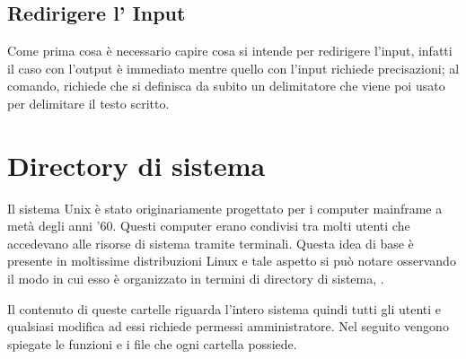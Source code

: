 \subsection{Redirigere l' Input}
\label{subsec:Redirigere-l-Input}
Come prima cosa è necessario capire cosa si intende per redirigere l'input, infatti il caso con l'output è immediato mentre quello con l'input richiede precisazioni;  al comando, richiede che si definisca da subito un delimitatore che viene poi usato per delimitare il testo scritto.


\section{Directory di sistema}
\label{sec:Directory-di-sistema}
Il sistema Unix è stato originariamente progettato per i computer mainframe a metà degli anni '60. Questi computer erano condivisi tra molti utenti che accedevano alle risorse di sistema tramite terminali. Questa idea di base è presente in moltissime distribuzioni Linux e tale aspetto si può notare osservando il modo in cui esso è organizzato in termini di directory di sistema, .



Il contenuto di queste cartelle riguarda l'intero sistema quindi tutti gli utenti e qualsiasi modifica ad essi richiede permessi amministratore. Nel seguito vengono spiegate le funzioni e i file che ogni cartella possiede.

